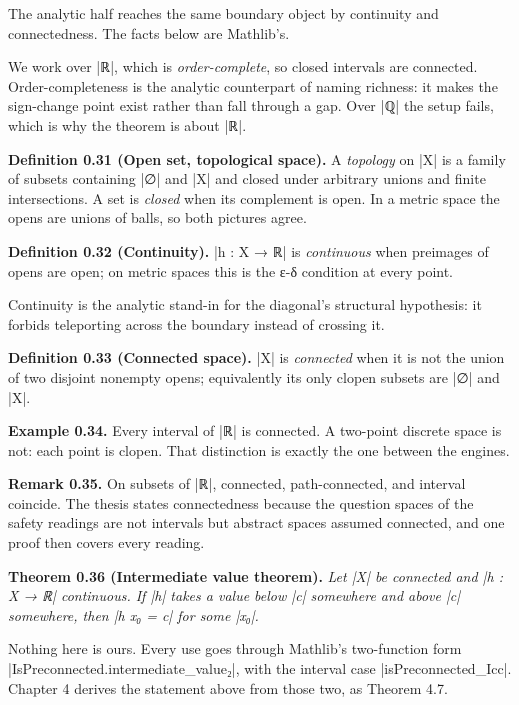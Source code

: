\documentclass{memoir}
\begin{document}
The analytic half reaches the same boundary object by continuity and
connectedness. The facts below are Mathlib's.

We work over \LeanVerb|ℝ|, which is \emph{order-complete}, so closed intervals are connected.
Order-completeness is the analytic counterpart of naming richness: it makes the
sign-change point exist rather than fall through a gap. Over \LeanVerb|ℚ| the setup
fails, which is why the theorem is about \LeanVerb|ℝ|.

\textbf{Definition 0.31 (Open set, topological space).} A \emph{topology} on \LeanVerb|X| is a family
of subsets containing \LeanVerb|∅| and \LeanVerb|X| and closed under arbitrary unions and finite
intersections. A set is \emph{closed} when its complement is open. In a metric space
the opens are unions of balls, so both pictures agree.

\textbf{Definition 0.32 (Continuity).} \LeanVerb|h : X → ℝ| is \emph{continuous} when preimages of
opens are open; on metric spaces this is the ε-δ condition at every point.

Continuity is the analytic stand-in for the diagonal's structural hypothesis: it
forbids teleporting across the boundary instead of crossing it.

\textbf{Definition 0.33 (Connected space).} \LeanVerb|X| is \emph{connected} when it is not the union
of two disjoint nonempty opens; equivalently its only clopen subsets are \LeanVerb|∅| and
\LeanVerb|X|.

\textbf{Example 0.34.} Every interval of \LeanVerb|ℝ| is connected. A two-point discrete space is
not: each point is clopen. That distinction is exactly the one between the
engines.

\textbf{Remark 0.35.} On subsets of \LeanVerb|ℝ|, connected, path-connected, and interval
coincide. The thesis states connectedness because the question spaces of the
safety readings are not intervals but abstract spaces assumed connected, and one
proof then covers every reading.

\textbf{Theorem 0.36 (Intermediate value theorem).} \emph{Let \LeanVerb|X| be connected and
\LeanVerb|h : X → ℝ| continuous. If \LeanVerb|h| takes a value below \LeanVerb|c| somewhere and above \LeanVerb|c|
somewhere, then \LeanVerb|h x₀ = c| for some \LeanVerb|x₀|.}

Nothing here is ours. Every use goes through Mathlib's two-function form
\LeanVerb|IsPreconnected.intermediate_value₂|, with the interval case
\LeanVerb|isPreconnected_Icc|. Chapter 4 derives the statement above from those two, as
Theorem 4.7.
\end{document}
